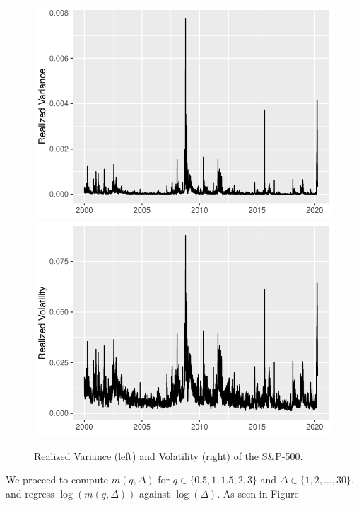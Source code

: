 \begin{figure}[H]
    \centering
    \includegraphics[scale=0.6]{fig/img/RealizedLib/SP500Realized.pdf}
    \includegraphics[scale=0.6]{fig/img/RealizedLib/SP500RealizedVol.pdf}
    \caption{Realized Variance (left) and Volatility (right) of the S\&P-500.}
    \label{fig:realized}
\end{figure}
We proceed to compute $m(q,\Delta)$ for $q\in \{0.5,1,1.5,2,3\}$ and $\Delta \in \{1,2,\dots,30\}$, and regress $\log(m(q,\Delta))$ against $\log(\Delta)$. As seen in Figure 
